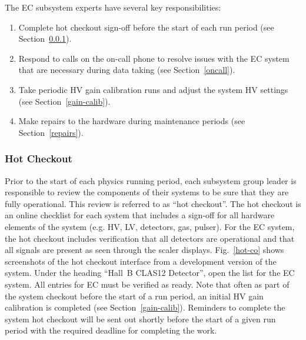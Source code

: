 \documentclass[letterpaper,10pt]{article}
\begin{document}
The EC subsystem experts have several key responsibilities:

\begin{enumerate}
\item Complete hot checkout sign-off before the start of each run period (see Section~\ref{checkout}).
\item Respond to calls on the on-call phone to resolve issues with the EC system that are necessary during
data taking (see Section~\ref{oncall}).
\item Take periodic HV gain calibration runs and adjust the system HV settings (see 
Section~\ref{gain-calib}).
\item Make repairs to the hardware during maintenance periods (see Section~\ref{repairs}).
\end{enumerate}

\subsubsection{Hot Checkout}
\label{checkout}

Prior to the start of each physics running period, each subsystem group leader is responsible to
review the components of their systems to be sure that they are fully operational. This review is
referred to as ``hot checkout''. The hot checkout is an online checklist for each system that
includes a sign-off for all hardware elements of the system (e.g. HV, LV, detectors, gas, pulser).
For the EC system, the hot checkout includes verification that all detectors are operational and
that all signals are present as seen through the scaler displays. Fig.~\ref{hot-co} shows screenshots 
of the hot checkout interface from a development version of the system. Under the heading ``Hall~B
CLAS12 Detector'', open the list for the EC system. All entries for EC must be verified as ready.
Note that often as part of the system checkout before the start of a run period, an initial HV gain 
calibration is completed (see Section~\ref{gain-calib}). Reminders to complete the system hot checkout
will be sent out shortly before the start of a given run period with the required deadline for
completing the work.
\end{document}
